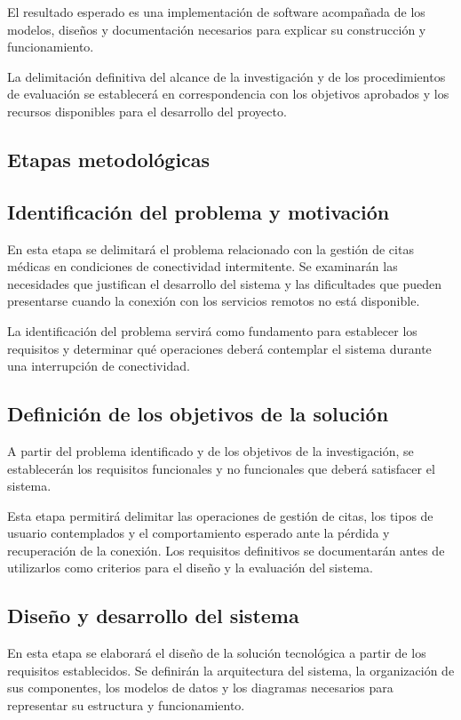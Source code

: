 El resultado esperado es una implementación de software
acompañada de los modelos, diseños y documentación necesarios
para explicar su construcción y funcionamiento.

La delimitación definitiva del alcance de la investigación
y de los procedimientos de evaluación se establecerá en
correspondencia con los objetivos aprobados y los recursos
disponibles para el desarrollo del proyecto.

\subsection{Etapas metodológicas}

\subsection{Identificación del problema y motivación}

En esta etapa se delimitará el problema relacionado con la
gestión de citas médicas en condiciones de conectividad
intermitente. Se examinarán las necesidades que justifican
el desarrollo del sistema y las dificultades que pueden
presentarse cuando la conexión con los servicios remotos
no está disponible.

La identificación del problema servirá como fundamento para
establecer los requisitos y determinar qué operaciones
deberá contemplar el sistema durante una interrupción de
conectividad.

\subsection{Definición de los objetivos de la solución}

A partir del problema identificado y de los objetivos de
la investigación, se establecerán los requisitos funcionales
y no funcionales que deberá satisfacer el sistema.

Esta etapa permitirá delimitar las operaciones de gestión
de citas, los tipos de usuario contemplados y el comportamiento
esperado ante la pérdida y recuperación de la conexión.
Los requisitos definitivos se documentarán antes de utilizarlos
como criterios para el diseño y la evaluación del sistema.

\subsection{Diseño y desarrollo del sistema}

En esta etapa se elaborará el diseño de la solución tecnológica
a partir de los requisitos establecidos. Se definirán la
arquitectura del sistema, la organización de sus componentes,
los modelos de datos y los diagramas necesarios para
representar su estructura y funcionamiento.

